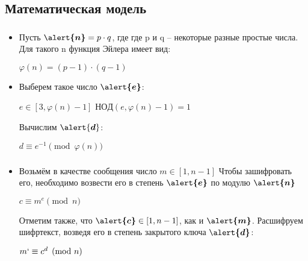 \documentclass[t]{beamer}
\begin{document}
\subsection{Математическая модель}

\begin{frame}
	\frametitle{\insertsection}
	\framesubtitle{\insertsubsection}
    \begin{itemize}
        \item<1-> 
            Пусть $ \boldsymbol{\alert{n}} = p \cdot q $, где где p и q – некоторые разные простые числа. Для такого n функция Эйлера имеет вид: \newline 
            \begin{center} $\varphi(n) = (p - 1) \cdot (q - 1)$ \end{center}
            \vspace{3mm}
        \item<2-> 
            Выберем такое число $\boldsymbol{\alert{e}}$: \newline 
            \begin{center}
               \hspace{10mm} $ e \in [3, \varphi(n) - 1]$ \newline 
                $НОД(e, \varphi(n) - 1) = 1$
            \end{center}
            Вычислим $\alert{\boldsymbol{d}}$:  \newline 
            \begin{center}
                \( d\equiv e^{-1} \pmod{\varphi(n)} \)
            \end{center}
    \end{itemize}
\end{frame}

\begin{frame}
    \frametitle{\insertsection}
	\framesubtitle{\insertsubsection}
	\begin{itemize}
	    \item<1-> Возьмём в качестве сообщения число $m \in [1, n-1]$ \newline 
	    Чтобы зашифровать его, необходимо возвести \newline его в степень $\boldsymbol{\alert{e}}$ по модулю $\boldsymbol{\alert{n}}$ \newline 
	    \begin{center}
	         \( c\equiv m^{e} \pmod{n} \)
	         \vspace{3mm}
	    \end{center}
	    Отметим также, что $\boldsymbol{\alert{c}} \in [1, n-1]$, как и $\boldsymbol{\alert{m}}$. Расшифруем шифртекст, возведя его в степень закрытого ключа $\boldsymbol{\alert{d}}$:
	    
	    \begin{center}
	    \vspace{3mm}
	        \( m` \equiv c^d \pmod{n} \)
	        \vspace{3mm}
	    \end{center}
	\end{itemize}
\end{frame}
\end{document}
